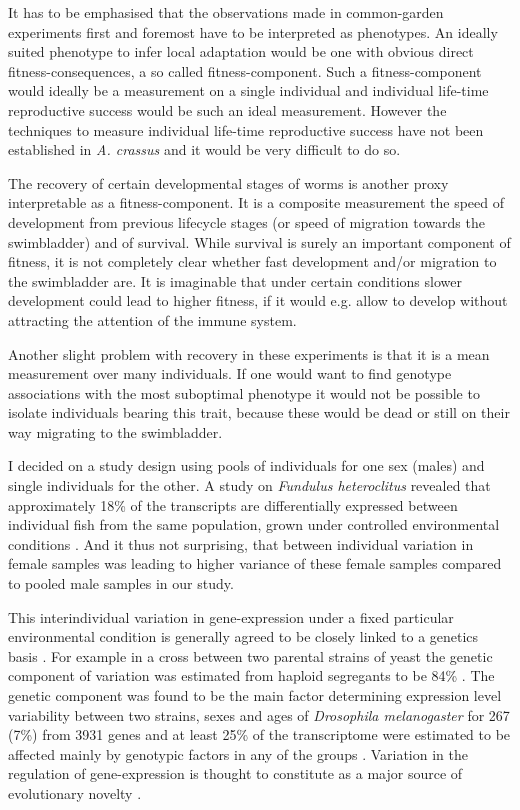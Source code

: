 It has to be emphasised that the observations made in common-garden
experiments first and foremost have to be interpreted as
phenotypes. An ideally suited phenotype to infer local adaptation
would be one with obvious direct fitness-consequences, a so called
fitness-component. Such a fitness-component would ideally be a
measurement on a single individual and individual life-time
reproductive success would be such an ideal measurement. However the
techniques to measure individual life-time reproductive success have
not been established in \textit{A. crassus} and it would be very
difficult to do so.

The recovery of certain developmental stages of worms is another proxy
interpretable as a fitness-component. It is a composite measurement
the speed of development from previous lifecycle stages (or speed of
migration towards the swimbladder) and of survival. While survival is
surely an important component of fitness, it is not completely clear
whether fast development and/or migration to the swimbladder are. It
is imaginable that under certain conditions slower development could
lead to higher fitness, if it would e.g. allow to develop without
attracting the attention of the immune system.

Another slight problem with recovery in these experiments is that it
is a mean measurement over many individuals. If one would want to find
genotype associations with the most suboptimal phenotype it would not
be possible to isolate individuals bearing this trait, because these
would be dead or still on their way migrating to the swimbladder.

I decided on a study design using pools of individuals for one sex
(males) and single individuals for the other. A study on
\textit{Fundulus heteroclitus} revealed that approximately 18\% of the
transcripts are differentially expressed between individual fish from
the same population, grown under controlled environmental conditions
\cite{pmid12219088}. And it thus not surprising, that between
individual variation in female samples was leading to higher variance
of these female samples compared to pooled male samples in our study.

This interindividual variation in gene-expression under a fixed
particular environmental condition is generally agreed to be closely
linked to a genetics basis \cite{pmid15498452}. For example in a cross
between two parental strains of yeast the genetic component of
variation was estimated from haploid segregants to be 84\%
\cite{pmid11923494}. The genetic component was found to be the main
factor determining expression level variability between two strains,
sexes and ages of \textit{Drosophila melanogaster} for 267 (7\%) from
3931 genes and at least 25\% of the transcriptome were estimated to
be affected mainly by genotypic factors in any of the groups
\cite{pmid11726925}. Variation in the regulation of gene-expression is
thought to constitute as a major source of evolutionary novelty
\cite{pmid11341673}.

